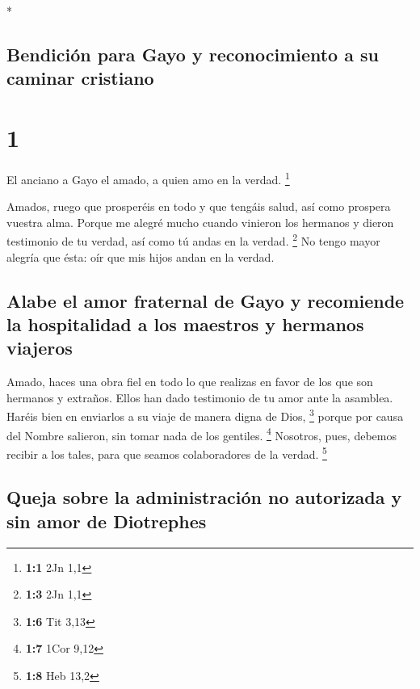 \begin{paracol}{2} \switchcolumn[0]*

\hypertarget{bendiciuxf3n-para-gayo-y-reconocimiento-a-su-caminar-cristiano}{%
\subsection{Bendición para Gayo y reconocimiento a su caminar
cristiano}\label{bendiciuxf3n-para-gayo-y-reconocimiento-a-su-caminar-cristiano}}

\hypertarget{section}{%
\section{1}\label{section}}

 El anciano a Gayo el amado, a quien amo en la verdad.
\footnote{\textbf{1:1} 2Jn 1,1}

 Amados, ruego que prosperéis en todo y que tengáis salud,
así como prospera vuestra alma.  Porque me alegré mucho
cuando vinieron los hermanos y dieron testimonio de tu verdad, así como
tú andas en la verdad. \footnote{\textbf{1:3} 2Jn 1,1}  No
tengo mayor alegría que ésta: oír que mis hijos andan en la verdad.

\hypertarget{alabe-el-amor-fraternal-de-gayo-y-recomiende-la-hospitalidad-a-los-maestros-y-hermanos-viajeros}{%
\subsection{Alabe el amor fraternal de Gayo y recomiende la hospitalidad
a los maestros y hermanos
viajeros}\label{alabe-el-amor-fraternal-de-gayo-y-recomiende-la-hospitalidad-a-los-maestros-y-hermanos-viajeros}}

 Amado, haces una obra fiel en todo lo que realizas en
favor de los que son hermanos y extraños.  Ellos han dado
testimonio de tu amor ante la asamblea. Haréis bien en enviarlos a su
viaje de manera digna de Dios, \footnote{\textbf{1:6} Tit 3,13}
 porque por causa del Nombre salieron, sin tomar nada de
los gentiles. \footnote{\textbf{1:7} 1Cor 9,12}  Nosotros,
pues, debemos recibir a los tales, para que seamos colaboradores de la
verdad. \footnote{\textbf{1:8} Heb 13,2}

\hypertarget{queja-sobre-la-administraciuxf3n-no-autorizada-y-sin-amor-de-diotrephes}{%
\subsection{Queja sobre la administración no autorizada y sin amor de
Diotrephes}\label{queja-sobre-la-administraciuxf3n-no-autorizada-y-sin-amor-de-diotrephes}}


\end{paracol}
